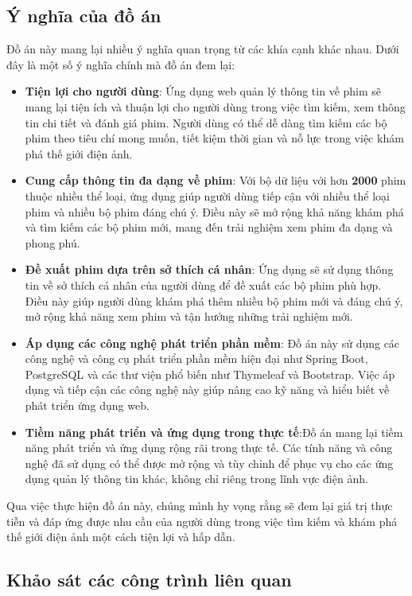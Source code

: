 \documentclass[12pt]{article}
\begin{document}
\subsection{Ý nghĩa của đồ án}
Đồ án này mang lại nhiều ý nghĩa quan trọng từ các khía cạnh khác nhau. Dưới đây là một số ý nghĩa chính mà đồ án đem lại:
\begin{itemize}
    \item \textbf{Tiện lợi cho người dùng}: Ứng dụng web quản lý thông tin về phim sẽ mang lại tiện ích và thuận lợi cho người dùng trong việc tìm kiếm, xem thông tin chi tiết và đánh giá phim. Người dùng có thể dễ dàng tìm kiếm các bộ phim theo tiêu chí mong muốn, tiết kiệm thời gian và nỗ lực trong việc khám phá thế giới điện ảnh.
    \item \textbf{Cung cấp thông tin đa dạng về phim}: Với bộ dữ liệu với hơn \textbf{2000} phim thuộc nhiều thể loại, ứng dụng giúp người dùng tiếp cận với nhiều thể loại phim và nhiều bộ phim đáng chú ý. Điều này sẽ mở rộng khả năng khám phá và tìm kiếm các bộ phim mới, mang đến trải nghiệm xem phim đa dạng và phong phú.
    \item \textbf{Đề xuất phim dựa trên sở thích cá nhân}:  Ứng dụng sẽ sử dụng thông tin về sở thích cá nhân của người dùng để đề xuất các bộ phim phù hợp. Điều này giúp người dùng khám phá thêm nhiều bộ phim mới và đáng chú ý, mở rộng khả năng xem phim và tận hưởng những trải nghiệm mới.
    \item \textbf{Áp dụng các công nghệ phát triển phần mềm}: Đồ án này sử dụng các công nghệ và công cụ phát triển phần mềm hiện đại như Spring Boot, PostgreSQL và các thư viện phổ biến như Thymeleaf và Bootstrap. Việc áp dụng và tiếp cận các công nghệ này giúp nâng cao kỹ năng và hiểu biết về phát triển ứng dụng web.
    \item \textbf{Tiềm năng phát triển và ứng dụng trong thực tế}:Đồ án mang lại tiềm năng phát triển và ứng dụng rộng rãi trong thực tế. Các tính năng và công nghệ đã sử dụng có thể được mở rộng và tùy chỉnh để phục vụ cho các ứng dụng quản lý thông tin khác, không chỉ riêng trong lĩnh vực điện ảnh.
\end{itemize}
Qua việc thực hiện đồ án này, chúng mình hy vọng rằng sẽ đem lại giá trị thực tiễn và đáp ứng được nhu cầu của người dùng trong việc tìm kiếm và khám phá thế giới điện ảnh một cách tiện lợi và hấp dẫn.


\subsection{ Khảo sát các công trình liên quan}
\end{document}
